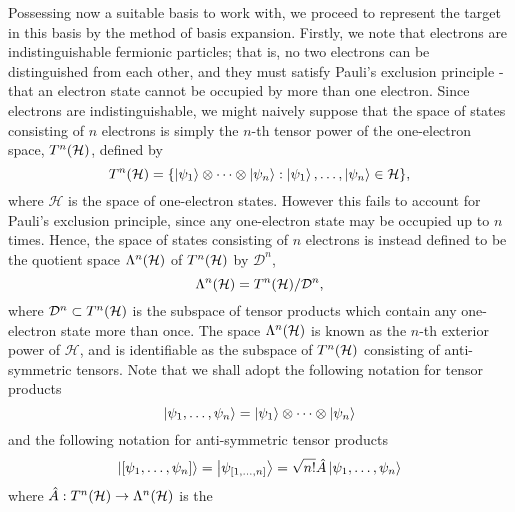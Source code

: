 \documentclass[draft]{article}
\begin{document}
Possessing now a suitable basis to work with, we proceed to represent the
target in this basis by the method of basis expansion.
Firstly, we note that electrons are indistinguishable fermionic particles; that
is, no two electrons can be distinguished from each other, and they must satisfy
Pauli's exclusion principle - that an electron state cannot be occupied by more
than one electron.
Since electrons are indistinguishable, we might naively suppose that the space
of states consisting of $n$ electrons is simply the $n$-th tensor power of the
one-electron space, $T^{n}(\mathcal{H})$, defined by
\begin{equation}
  \label{eq:tensor-power}
  T^{n}(\mathcal{H})
  =
  \lbrace
    \ket{\psi_{1}}
    \otimes
    \dots
    \otimes
    \ket{\psi_{n}}
    :
    \ket{\psi_{1}},
    \dotsc,
    \ket{\psi_{n}}
    \in \mathcal{H}
  \rbrace
  ,
\end{equation}
where $\mathcal{H}$ is the space of one-electron states.
However this fails to account for Pauli's exclusion principle, since any
one-electron state may be occupied up to $n$ times.
Hence, the space of states consisting of $n$ electrons is instead defined to be
the quotient space $\Lambda^{n}(\mathcal{H})$ of $T^{n}(\mathcal{H})$ by
$\mathcal{D}^{n}$,
\begin{equation}
  \label{eq:exterior-power}
  \Lambda^{n}(\mathcal{H})
  =
  T^{n}(\mathcal{H})
  /
  \mathcal{D}^{n}
  ,
\end{equation}
where $\mathcal{D}^{n} \subset T^{n}(\mathcal{H})$ is the subspace of tensor
products which contain any one-electron state more than once.
The space $\Lambda^{n}(\mathcal{H})$ is known as the $n$-th exterior power of
$\mathcal{H}$, and is identifiable as the subspace of $T^{n}(\mathcal{H})$
consisting of anti-symmetric tensors.
Note that we shall adopt the following notation for tensor products
\begin{equation}
  \label{eq:tensor-product-notation}
  \ket{\psi_{1}, \dotsc, \psi_{n}}
  =
  \ket{\psi_{1}}
  \otimes
  \dots
  \otimes
  \ket{\psi_{n}}
\end{equation}
and the following notation for anti-symmetric tensor products
\begin{equation}
  \label{eq:anti-symmetric-tensor-product-notation}
  \ket{[\psi_{1}, \dotsc, \psi_{n}]}
  =
  \ket{\psi_{[1, \dotsc, n]}}
  =
  \sqrt{n!}
  \hat{A}
  \ket{\psi_{1}, \dotsc, \psi_{n}}
\end{equation}
where $\hat{A} : T^{n}(\mathcal{H}) \to \Lambda^{n}(\mathcal{H})$ is the
\end{document}
